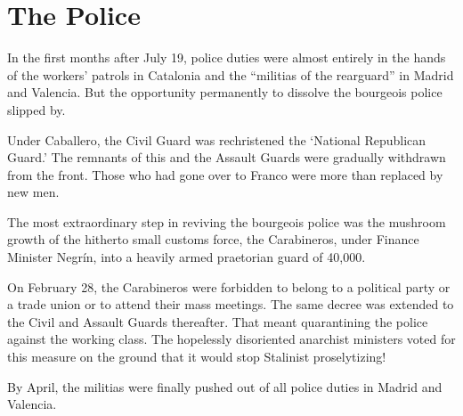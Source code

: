 \section{The Police}

In the first months after July 19, police duties were almost entirely in the hands of the workers’ patrols in Catalonia and the ``militias of the rearguard'' in Madrid and Valencia. But the opportunity permanently to dissolve the bourgeois police slipped by.

Under Caballero, the Civil Guard was rechristened the `National Republican Guard.' The remnants of this and the Assault Guards were gradually withdrawn from the front. Those who had gone over to Franco were more than replaced by new men.

The most extraordinary step in reviving the bourgeois police was the mushroom growth of the hitherto small customs force, the Carabineros, under Finance Minister Negr\'in, into a heavily armed praetorian guard of 40,000.

On February 28, the Carabineros were forbidden to belong to a political party or a trade union or to attend their mass meetings. The same decree was extended to the Civil and Assault Guards thereafter. That meant quarantining the police against the working class. The hopelessly disoriented anarchist ministers voted for this measure on the ground that it would stop Stalinist proselytizing!

By April, the militias were finally pushed out of all police duties in Madrid and Valencia.

